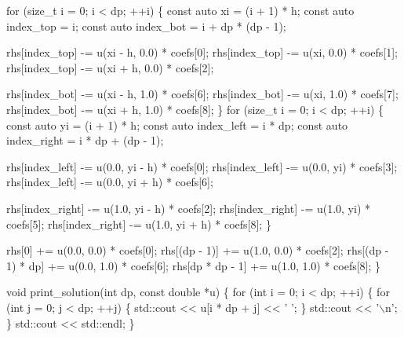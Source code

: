 \begin{DoxyCodeInclude}
    \textcolor{keywordflow}{for} (\textcolor{keywordtype}{size\_t} i = 0; i < dp; ++i) \{
        \textcolor{keyword}{const} \textcolor{keyword}{auto} xi = (i + 1) * h;
        \textcolor{keyword}{const} \textcolor{keyword}{auto} index\_top = i;
        \textcolor{keyword}{const} \textcolor{keyword}{auto} index\_bot = i + dp * (dp - 1);

        rhs[index\_top] -= u(xi - h, 0.0) * coefs[0];
        rhs[index\_top] -= u(xi, 0.0) * coefs[1];
        rhs[index\_top] -= u(xi + h, 0.0) * coefs[2];

        rhs[index\_bot] -= u(xi - h, 1.0) * coefs[6];
        rhs[index\_bot] -= u(xi, 1.0) * coefs[7];
        rhs[index\_bot] -= u(xi + h, 1.0) * coefs[8];
    \}
    \textcolor{keywordflow}{for} (\textcolor{keywordtype}{size\_t} i = 0; i < dp; ++i) \{
        \textcolor{keyword}{const} \textcolor{keyword}{auto} yi = (i + 1) * h;
        \textcolor{keyword}{const} \textcolor{keyword}{auto} index\_left = i * dp;
        \textcolor{keyword}{const} \textcolor{keyword}{auto} index\_right = i * dp + (dp - 1);

        rhs[index\_left] -= u(0.0, yi - h) * coefs[0];
        rhs[index\_left] -= u(0.0, yi) * coefs[3];
        rhs[index\_left] -= u(0.0, yi + h) * coefs[6];

        rhs[index\_right] -= u(1.0, yi - h) * coefs[2];
        rhs[index\_right] -= u(1.0, yi) * coefs[5];
        rhs[index\_right] -= u(1.0, yi + h) * coefs[8];
    \}

    rhs[0] += u(0.0, 0.0) * coefs[0];
    rhs[(dp - 1)] += u(1.0, 0.0) * coefs[2];
    rhs[(dp - 1) * dp] += u(0.0, 1.0) * coefs[6];
    rhs[dp * dp - 1] += u(1.0, 1.0) * coefs[8];
\}


\textcolor{keywordtype}{void} print\_solution(\textcolor{keywordtype}{int} dp, \textcolor{keyword}{const} \textcolor{keywordtype}{double} *u)
\{
    \textcolor{keywordflow}{for} (\textcolor{keywordtype}{int} i = 0; i < dp; ++i) \{
        \textcolor{keywordflow}{for} (\textcolor{keywordtype}{int} j = 0; j < dp; ++j) \{
            std::cout << u[i * dp + j] << \textcolor{charliteral}{' '};
        \}
        std::cout << \textcolor{charliteral}{'\(\backslash\)n'};
    \}
    std::cout << std::endl;
\}



\end{DoxyCodeInclude}
